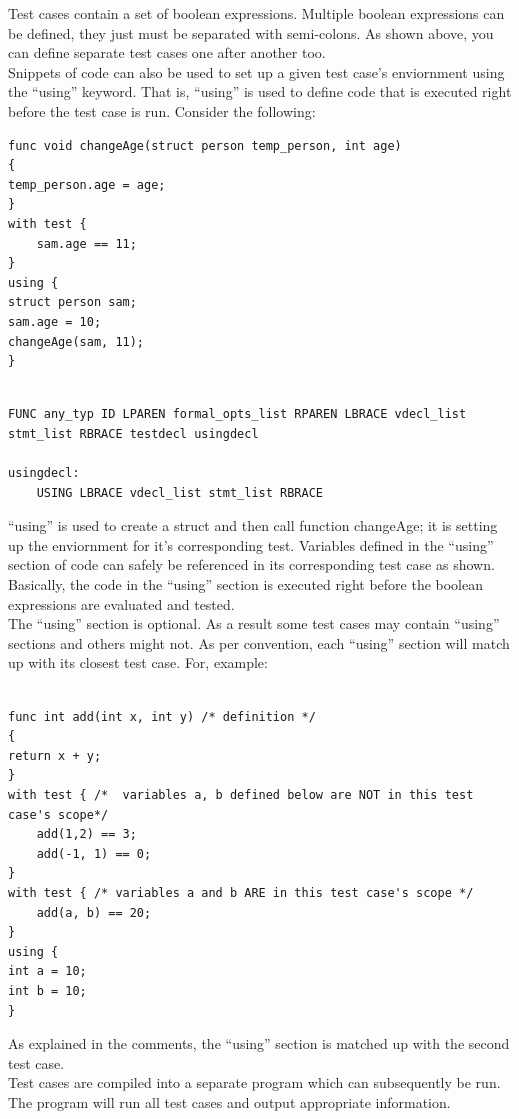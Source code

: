 \documentclass{article}
\begin{document}
Test cases contain a set of boolean expressions. Multiple boolean expressions can be defined, they just must be separated with semi-colons. As shown above, you can define separate test cases one after another too. \\ 
Snippets of code can also be used to set up a given test case's enviornment using the ``using'' keyword. That is, ``using'' is used to define code that is executed right before the test case is run. Consider the following:

\begin{lstlisting}
func void changeAge(struct person temp_person, int age)
{
temp_person.age = age;
}
with test {
	sam.age == 11;
}
using {
struct person sam;
sam.age = 10;
changeAge(sam, 11);
}


\end{lstlisting}


\begin{Verbatim}[frame=single]
FUNC any_typ ID LPAREN formal_opts_list RPAREN LBRACE vdecl_list stmt_list RBRACE testdecl usingdecl 

usingdecl:
	USING LBRACE vdecl_list stmt_list RBRACE 
\end{Verbatim}


``using'' is used to create a struct and then call function changeAge; it is setting up the enviornment for it's corresponding test. Variables defined in the ``using'' section of code can safely be referenced in its corresponding test case as shown. Basically, the code in the ``using'' section is executed right before the boolean expressions are evaluated and tested. \\
The ``using'' section is optional. As a result some test cases may contain ``using'' sections and others might not. As per convention, each ``using'' section will match up with its closest test case. For, example:

\begin{lstlisting}

func int add(int x, int y) /* definition */
{
return x + y;
}
with test { /*  variables a, b defined below are NOT in this test case's scope*/
	add(1,2) == 3;
	add(-1, 1) == 0;
}
with test { /* variables a and b ARE in this test case's scope */
	add(a, b) == 20;
}
using {
int a = 10;
int b = 10;
}

\end{lstlisting}

As explained in the comments, the ``using'' section is matched up with the second test case.
\\
Test cases are compiled into a separate program which can subsequently be run. The program will run all test cases and output appropriate information.
\end{document}
